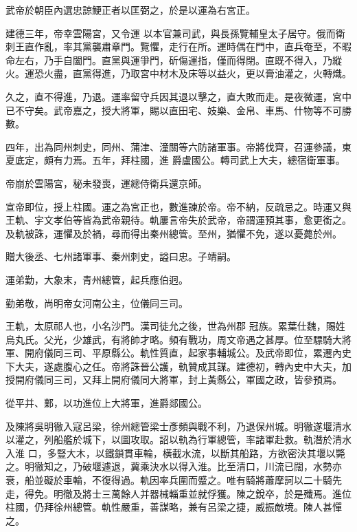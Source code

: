 \begin{pinyinscope}
 武帝於朝臣內選忠諒鯁正者以匡弼之，於是以運為右宮正。



 建德三年，帝幸雲陽宮，又令運
 以本官兼司武，與長孫覽輔皇太子居守。俄而衛刺王直作亂，率其黨襲肅章門。覽懼，走行在所。運時偶在門中，直兵奄至，不暇命左右，乃手自闔門。直黨與運爭門，斫傷運指，僅而得閉。直既不得入，乃縱火。運恐火盡，直黨得進，乃取宮中材木及床等以益火，更以膏油灌之，火轉熾。



 久之，直不得進，乃退。運率留守兵因其退以擊之，直大敗而走。是夜微運，宮中已不守矣。武帝嘉之，授大將軍，賜以直田宅、妓樂、金帛、車馬、什物等不可勝數。



 四年，出為同州刺史，同州、蒲津、潼關等六防諸軍事。帝將伐齊，召運參議，東夏底定，頗有力焉。五年，拜柱國，進
 爵盧國公。轉司武上大夫，總宿衛軍事。



 帝崩於雲陽宮，秘未發喪，運總侍衛兵還京師。



 宣帝即位，授上柱國。運之為宮正也，數進諫於帝。帝不納，反疏忌之。時運又與王軌、宇文孝伯等皆為武帝親待。軌屢言帝失於武帝，帝謂運預其事，愈更銜之。及軌被誅，運懼及於禍，尋而得出秦州總管。至州，猶懼不免，遂以憂薨於州。



 贈大後丞、七州諸軍事、秦州刺史，謚曰忠。子靖嗣。



 運弟勤，大象末，青州總管，起兵應伯迥。



 勤弟敬，尚明帝女河南公主，位儀同三司。



 王軌，太原祁人也，小名沙門。漢司徒允之後，世為州郡
 冠族。累葉仕魏，賜姓烏丸氏。父光，少雄武，有將帥才略。頻有戰功，周文帝遇之甚厚。位至驃騎大將軍、開府儀同三司、平原縣公。軌性質直，起家事輔城公。及武帝即位，累遷內史下大夫，遂處腹心之任。帝將誅晉公護，軌贊成其謀。建德初，轉內史中大夫，加授開府儀同三司，又拜上開府儀同大將軍，封上黃縣公，軍國之政，皆參預焉。



 從平并、鄴，以功進位上大將軍，進爵郯國公。



 及陳將吳明徹入寇呂梁，徐州總管梁士彥頻與戰不利，乃退保州城。明徹遂堰清水以灌之，列船艦於城下，以圖攻取。詔以軌為行軍總管，率諸軍赴救。軌潛於清水入淮
 口，多豎大木，以鐵鎖貫車輪，橫截水流，以斷其船路，方欲密決其堰以斃之。明徹知之，乃破堰遽退，冀乘決水以得入淮。比至清口，川流已闊，水勢亦衰，船並礙於車輪，不復得過。軌因率兵圍而蹙之。唯有騎將蕭摩訶以二十騎先走，得免。明徹及將士三萬餘人并器械輜重並就俘獲。陳之銳卒，於是殲焉。進位柱國，仍拜徐州總管。軌性嚴重，善謀略，兼有呂梁之捷，威振敵境。陳人甚憚之。




\end{pinyinscope}
